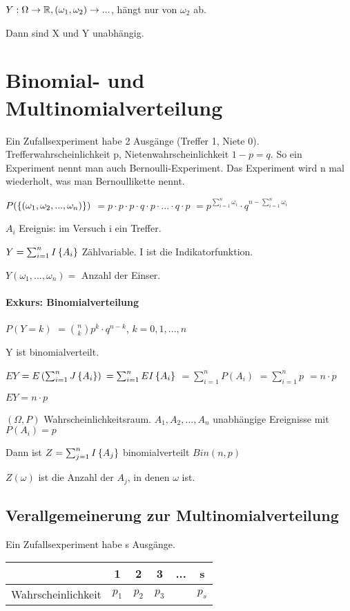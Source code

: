 $Y: \Omega \rightarrow \mathbb{R}, (\omega_1, \omega_2) \rightarrow ...$, hängt nur von $\omega_2$ ab.

Dann sind X und Y unabhängig. 

\section{Binomial- und Multinomialverteilung}
Ein Zufallsexperiment habe 2 Ausgänge (Treffer 1, Niete 0). Trefferwahrscheinlichkeit p, Nietenwahrscheinlichkeit $1-p=q$. So ein Experiment nennt man auch Bernoulli-Experiment. Das Experiment wird n mal wiederholt, was man Bernoullikette nennt. 

$P( \left\lbrace (\omega_1, \omega_2, ..., \omega_n) \right\rbrace ) $
$=p\cdot p\cdot p\cdot q\cdot p\cdot ... \cdot q \cdot p$
$=p^{\sum_{i=1}^{n} \omega_i} \cdot q^{n - \sum_{i=1}^{n} \omega_i} $

$A_i$ Ereignis: im Versuch i ein Treffer.

$Y=\sum_{i=1}^{n} I \left\lbrace A_i \right\rbrace $ Zählvariable. I ist die Indikatorfunktion.

$Y(\omega_1, ..., \omega_n) = $ Anzahl der Einser. 

\paragraph{Exkurs: Binomialverteilung}
$P(Y=k) $
$= \binom n k p^k \cdot q^{n-k}$, $k=0,1,...,n$

Y ist binomialverteilt. 

$EY$
$=E \left( \sum_{i=1}^{n} J \left\lbrace A_i \right\rbrace  \right) $
$=\sum_{i=1}^{n} E I \left\lbrace A_i \right\rbrace $
$=\sum_{i=1}^{n} P(A_i) $
$=\sum_{i=1}^{n} p $
\underline{$= n\cdot p$}

\underline{$EY = n\cdot p$}

\begin{satz}
$(\Omega, P)$ Wahrscheinlichkeitsraum. 
$A_1, A_2, ..., A_n$ unabhängige Ereignisse mit $P(A_i)=p$

Dann ist $Z=\sum_{j=1}^{n} I \left\lbrace A_j \right\rbrace $ binomialverteilt $Bin(n,p)$

$Z(\omega)$ ist die Anzahl der $A_j$, in denen $\omega$ ist. 
\end{satz}

\subsection{Verallgemeinerung zur Multinomialverteilung}
Ein Zufallsexperiment habe s Ausgänge. 

\begin{tabular}{|c|c|c|c|c|c|}
\hline  & 1 & 2 & 3 & ... & s \\ 
\hline Wahrscheinlichkeit & $p_1$ & $p_2$ & $p_3$ &  & $p_s$ \\ 
\hline 
\end{tabular} 

